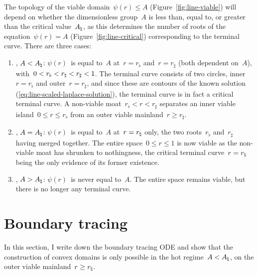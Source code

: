 The topology of the viable domain~$\psi (r) \le A$
(Figure~\ref{fig:line-viable})
will depend on whether the dimensionless group~$A$ is
less than, equal to, or greater than the critical value~$A_\natural$,
as this determines the number of roots of the equation~$\psi (r) = A$
(Figure~\ref{fig:line-critical})
corresponding to the terminal curve.
There are three cases:
\begin{enumerate}
  \item
  \label{itm:polar.regimes.hot}
    , $A < A_\natural$:
    $\psi (r)$~is equal to~$A$ at~$r = r_\flat$ and~$r = r_\sharp$
    (both dependent on~$A$),
    with~$0 <  r_\flat < r_\natural < r_\sharp < 1$.
    The terminal curve consists of two circles,
    inner~$r = r_\flat$ and outer~$r = r_\sharp$,
    and since these are contours of the known solution~%
      (\ref{eq:line-scaled-laplace-solution}),
    the terminal curve is in fact a critical terminal curve.
    A non-viable moat~$r_\flat < r < r_\sharp$
    separates an inner viable island~$0 \le r \le r_\flat$
    from an outer viable mainland~$r \ge r_\sharp$.
  \item
    , $A = A_\natural$:
    $\psi (r)$~is equal to~$A$ at~$r = r_\natural$ only,
    the two roots~$r_\flat$ and~$r_\sharp$ having merged together.
    The entire space~$0 \le r \le 1$ is now viable
    as the non-viable moat has shrunken to nothingness,
    the critical terminal curve~$r = r_\natural$
    being the only evidence of its former existence.
  \item
    , $A > A_\natural$:
    $\psi (r)$~is never equal to~$A$.
    The entire space remains viable,
    but there is no longer any terminal curve.
\end{enumerate}

\begin{figure}
\end{figure}

\section{Boundary tracing}
\label{sec:polar.tracing}

In this section, I write down the boundary tracing ODE
and show that the construction of convex domains
is only possible in the hot regime~$A < A_\natural$,
on the outer viable mainland~$r \ge r_\natural$.

